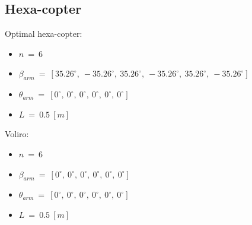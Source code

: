 \begin{table}[!h]
\begin{center}
 \caption{Comparison between the two designs' hover capabilities.}\vspace{1ex}
 \label{tab:tab_Quad_compare_hover}
\end{center}
\end{table}

\subsection{Hexa-copter}
\label{sec:hexa_copter}

Optimal hexa-copter:
\begin{itemize}
  \item $n\ =\ 6$
  \item $\beta_{arm}\ =\ [35.26^{\circ},\  -35.26^{\circ},\  35.26^{\circ},\  -35.26^{\circ},\
                          35.26^{\circ},\  -35.26^{\circ}]$
  \item $\theta_{arm}\ =\ [0^{\circ},\  0^{\circ},\  0^{\circ},\  0^{\circ},\ 0^{\circ},\  0^{\circ}]$
  \item $L\ =\ 0.5\ [m]$
\end{itemize}

Voliro:
\begin{itemize}
  \item $n\ =\ 6$
  \item $\beta_{arm}\ =\ [0^{\circ},\  0^{\circ},\  0^{\circ},\  0^{\circ},\ 0^{\circ},\  0^{\circ}]$
  \item $\theta_{arm}\ =\ [0^{\circ},\  0^{\circ},\  0^{\circ},\  0^{\circ},\ 0^{\circ},\  0^{\circ}]$
  \item $L\ =\ 0.5\ [m]$
\end{itemize}

